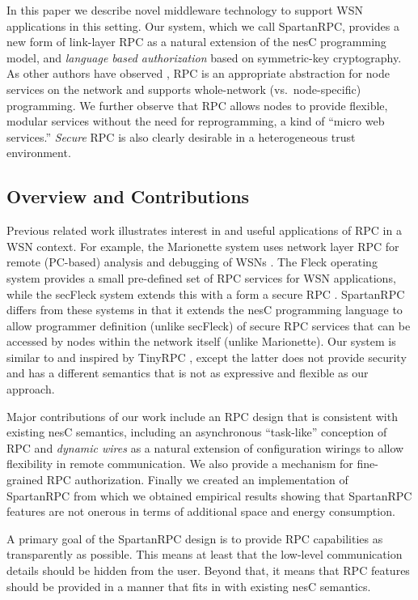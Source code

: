 In this paper we describe novel middleware technology to support WSN applications in this
setting. Our system, which we call SpartanRPC, provides a new form of link-layer RPC as a
natural extension of the nesC programming model, and \emph{language based authorization} based
on symmetric-key cryptography. As other authors have observed \cite{may-tinyrpc-2007}, RPC is an
appropriate abstraction for node services on the network and supports whole-network
(vs.~node-specific) programming. We further observe that RPC allows nodes to provide flexible,
modular services without the need for reprogramming, a kind of ``micro web services.''
\emph{Secure} RPC is also clearly desirable in a heterogeneous trust environment.

\subsection{Overview and Contributions}

Previous related work illustrates interest in and useful applications of RPC in a WSN context.
For example, the Marionette system uses network layer RPC for remote (PC-based) analysis and
debugging of WSNs \cite{whitehouse-marionette-2006}. The Fleck operating system provides a small
pre-defined set of RPC services for WSN applications, while the secFleck system extends this
with a form a secure RPC \cite{hu-secfleck-2009}. SpartanRPC differs from these systems in that
it extends the nesC programming language to allow programmer definition (unlike secFleck) of
secure RPC services that can be accessed by nodes within the network itself (unlike Marionette).
Our system is similar to and inspired by TinyRPC \cite{may-tinyrpc-2007}, except the latter does
not provide security and has a different semantics that is not as expressive and flexible as our
approach.

Major contributions of our work include an RPC design that is consistent with existing nesC
semantics, including an asynchronous ``task-like'' conception of RPC and \emph{dynamic wires} as
a natural extension of configuration wirings to allow flexibility in remote communication. We
also provide a mechanism for fine-grained RPC authorization. Finally we created an
implementation of SpartanRPC \cite{sprocket} from which we obtained empirical results showing
that SpartanRPC features are not onerous in terms of additional space and energy consumption.
   
A primary goal of the SpartanRPC design is to provide RPC capabilities as transparently as
possible. This means at least that the low-level communication details should be hidden from the
user. Beyond that, it means that RPC features should be provided in a manner that fits in with
existing nesC semantics.

